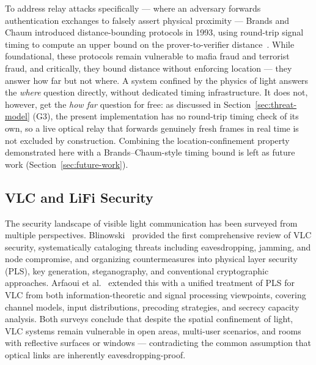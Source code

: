 \documentclass[conference]{IEEEtran}
\begin{document}
To address relay attacks specifically — where an adversary forwards authentication exchanges to falsely assert physical proximity — Brands and Chaum introduced distance-bounding protocols in 1993, using round-trip signal timing to compute an upper bound on the prover-to-verifier distance~\cite{brands1993}. While foundational, these protocols remain vulnerable to mafia fraud and terrorist fraud, and critically, they bound distance without enforcing location — they answer how far but not where. A system confined by the physics of light answers the \emph{where} question directly, without dedicated timing infrastructure. It does not, however, get the \emph{how far} question for free: as discussed in Section~\ref{sec:threat-model} (G3), the present implementation has no round-trip timing check of its own, so a live optical relay that forwards genuinely fresh frames in real time is not excluded by construction. Combining the location-confinement property demonstrated here with a Brands--Chaum-style timing bound is left as future work (Section~\ref{sec:future-work}).

\subsection{VLC and LiFi Security}

The security landscape of visible light communication has been surveyed from multiple perspectives. Blinowski~\cite{blinowski2019} provided the first comprehensive review of VLC security, systematically cataloging threats including eavesdropping, jamming, and node compromise, and organizing countermeasures into physical layer security (PLS), key generation, steganography, and conventional cryptographic approaches. Arfaoui et al.~\cite{arfaoui2020} extended this with a unified treatment of PLS for VLC from both information-theoretic and signal processing viewpoints, covering channel models, input distributions, precoding strategies, and secrecy capacity analysis. Both surveys conclude that despite the spatial confinement of light, VLC systems remain vulnerable in open areas, multi-user scenarios, and rooms with reflective surfaces or windows --- contradicting the common assumption that optical links are inherently eavesdropping-proof.
\end{document}
